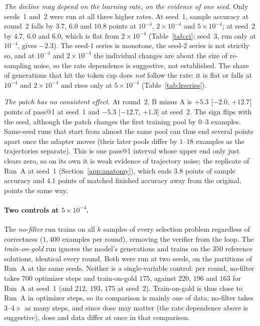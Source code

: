 \documentclass[runningheads]{llncs}
\begin{document}
\emph{The decline may depend on the learning rate, on the evidence of one
seed.} Only seeds~1 and~2 were run at all three higher rates. At seed~1, sample
accuracy at round~2 falls by $3.7$, $6.0$ and $10.8$ points at $10^{-4}$,
$2\times10^{-4}$ and $5\times10^{-4}$; at seed~2 by $4.7$, $6.0$ and $6.0$, which
is flat from $2\times10^{-4}$ (Table~\ref{tab:ci}; seed~3, run only at $10^{-4}$, gives
$-2.3$). The seed-1 series is monotone, the seed-2 series is not strictly so, and at
$10^{-4}$ and $2\times10^{-4}$ the individual changes are about the size of
re-sampling noise, so the rate dependence is suggestive, not established. The
share of generations that hit the token cap does \emph{not} follow the rate:
it is flat or falls at $10^{-4}$ and $2\times10^{-4}$ and rises only at
$5\times10^{-4}$ (Table~\ref{tab:lrseries}).

\emph{The patch has no consistent effect.} At round~2, B minus A is $+5.3$ [$-2.0$, $+12.7$]
points of pass@1 at seed~1 and $-5.3$ [$-12.7$, $+1.3$] at seed~2. The sign flips with the seed, although the patch changes the first training
pool by $0$--$3$ examples. Same-seed runs that start from almost the same pool
can thus end several points apart once the adapter moves (their later pools
differ by $1$--$18$ examples as the trajectories separate). This is one pass@1
interval whose upper end only just clears zero, so on its own it is weak
evidence of trajectory noise; the replicate of Run~A at seed~1
(Section~\ref{app:anatomy}), which ends $3.8$ points of sample accuracy and
$4.1$ points of matched finished accuracy away from the original, points the
same way.


\paragraph{Two controls at $5\times10^{-4}$.}
The \emph{no-filter} run trains on all $k$ samples of every selection problem
regardless of correctness ($1{,}400$ examples per round), removing the verifier
from the loop. The \emph{train-on-gold} run ignores the model's generations and
trains on the $350$ reference solutions, identical every round. Both were run at
two seeds, on the partitions of Run~A at the same seeds. Neither is a
single-variable control: per round, no-filter takes $700$ optimizer steps and
train-on-gold $175$, against $220$, $196$ and $163$ for Run~A at seed~1 (and
$212$, $193$, $175$ at seed~2). Train-on-gold is thus close to Run~A in
optimizer steps, so its comparison is mainly one of data; no-filter takes
$3$--$4\times$ as many steps, and since dose may matter (the rate dependence
above is suggestive), dose and data differ at once in that comparison.
\end{document}
